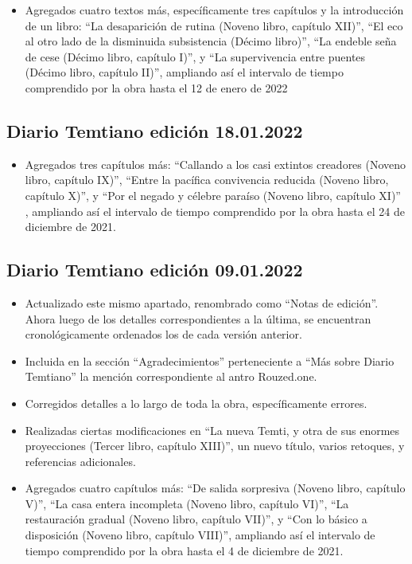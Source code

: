 \documentclass[
]{book}
\providecommand{\tightlist}{%
  \setlength{\itemsep}{0pt}\setlength{\parskip}{0pt}}
\begin{document}
\begin{itemize}
\tightlist
\item
  Agregados cuatro textos más, específicamente tres capítulos y la introducción de un libro: ``La desaparición de rutina (Noveno libro, capítulo XII)'', ``El eco al otro lado de la disminuida subsistencia (Décimo libro)'', ``La endeble seña de cese (Décimo libro, capítulo I)'', y ``La supervivencia entre puentes (Décimo libro, capítulo II)'', ampliando así el intervalo de tiempo comprendido por la obra hasta el 12 de enero de 2022
\end{itemize}

\hypertarget{diario-temtiano-ediciuxf3n-18.01.2022}{%
\subsection*{Diario Temtiano edición 18.01.2022}\label{diario-temtiano-ediciuxf3n-18.01.2022}}

\begin{itemize}
\tightlist
\item
  Agregados tres capítulos más: ``Callando a los casi extintos creadores (Noveno libro, capítulo IX)'', ``Entre la pacífica convivencia reducida (Noveno libro, capítulo X)'', y ``Por el negado y célebre paraíso (Noveno libro, capítulo XI)'' , ampliando así el intervalo de tiempo comprendido por la obra hasta el 24 de diciembre de 2021.
\end{itemize}

\hypertarget{diario-temtiano-ediciuxf3n-09.01.2022}{%
\subsection*{Diario Temtiano edición 09.01.2022}\label{diario-temtiano-ediciuxf3n-09.01.2022}}

\begin{itemize}
\item
  Actualizado este mismo apartado, renombrado como ``Notas de edición''. Ahora luego de los detalles correspondientes a la última, se encuentran cronológicamente ordenados los de cada versión anterior.
\item
  Incluida en la sección ``Agradecimientos'' perteneciente a ``Más sobre Diario Temtiano'' la mención correspondiente al antro Rouzed.one.
\item
  Corregidos detalles a lo largo de toda la obra, específicamente errores.
\item
  Realizadas ciertas modificaciones en ``La nueva Temti, y otra de sus enormes proyecciones (Tercer libro, capítulo XIII)'', un nuevo título, varios retoques, y referencias adicionales.
\item
  Agregados cuatro capítulos más: ``De salida sorpresiva (Noveno libro, capítulo V)'', ``La casa entera incompleta (Noveno libro, capítulo VI)'', ``La restauración gradual (Noveno libro, capítulo VII)'', y ``Con lo básico a disposición (Noveno libro, capítulo VIII)'', ampliando así el intervalo de tiempo comprendido por la obra hasta el 4 de diciembre de 2021.
\end{itemize}
\end{document}
